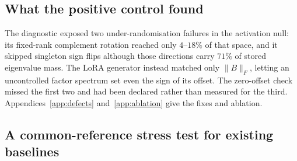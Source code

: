 \subsection{What the positive control found}
\label{sec:defects}

The diagnostic exposed two under-randomisation failures in the activation null: its fixed-rank
complement rotation reached only $4$--$18\%$ of that space, and it skipped singleton sign flips
although those directions carry $71\%$ of stored eigenvalue mass. The LoRA generator instead
matched only $\|B\|_F$, letting an uncontrolled factor spectrum set even the sign of its offset.
The zero-offset check missed the first two and had been declared rather than measured for the
third. Appendices~\ref{app:defects} and~\ref{app:ablation} give the fixes and ablation.

\subsection{A common-reference stress test for existing baselines}
\label{sec:baselines}

